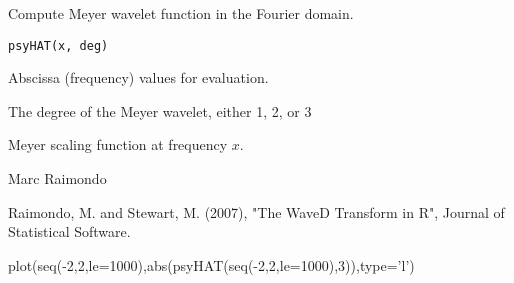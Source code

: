 \documentclass{article}
\begin{document}
\begin{Description}\relax
Compute Meyer wavelet function in the Fourier domain.
\end{Description}
\begin{Usage}
\begin{verbatim}
psyHAT(x, deg)
\end{verbatim}
\end{Usage}
\begin{Arguments}
\begin{ldescription}
\item[\code{x}] Abscissa (frequency) values for  evaluation.
\item[\code{deg}] The degree of the Meyer wavelet, either 1, 2, or 3 
\end{ldescription}
\end{Arguments}
\begin{Value}
Meyer scaling function at frequency $x$.
\end{Value}
\begin{Author}\relax
Marc Raimondo
\end{Author}
\begin{References}\relax
Raimondo, M. and Stewart, M. (2007),
"The WaveD Transform in R", Journal of Statistical Software.
\end{References}
\begin{SeeAlso}\relax
{}
\end{SeeAlso}
\begin{Examples}
\begin{ExampleCode}
plot(seq(-2,2,le=1000),abs(psyHAT(seq(-2,2,le=1000),3)),type='l')

\end{ExampleCode}
\end{Examples}
\end{document}

